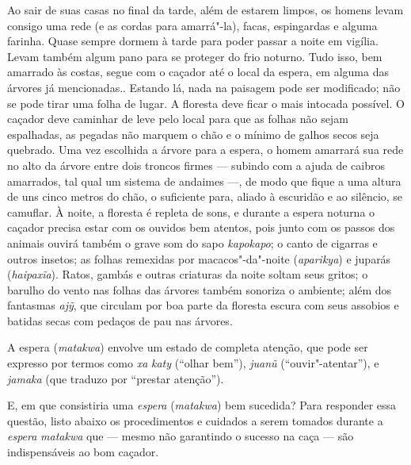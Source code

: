 Ao sair de suas casas no final da tarde, além de estarem limpos, os
homens levam consigo uma rede (e as cordas para amarrá"-la), facas,
espingardas e alguma farinha. Quase sempre dormem à tarde para poder
passar a noite em vigília. Levam também algum pano para se proteger do
frio noturno. Tudo isso, bem amarrado às costas, segue com o caçador até
o local da espera, em alguma das árvores já mencionadas.. Estando lá,
nada na paisagem pode ser modificado; não se pode tirar uma folha de
lugar. A floresta deve ficar o mais intocada possível. O caçador deve
caminhar de leve pelo local para que as folhas não sejam espalhadas, as
pegadas não marquem o chão e o mínimo de galhos secos seja quebrado. Uma
vez escolhida a árvore para a espera, o homem amarrará sua rede no alto
da árvore entre dois troncos firmes --- subindo com a ajuda de caibros
amarrados, tal qual um sistema de andaimes ---, de modo que fique a uma
altura de uns cinco metros do chão, o suficiente para, aliado à
escuridão e ao silêncio, se camuflar. À noite, a floresta é repleta de
sons, e durante a espera noturna o caçador precisa estar com os ouvidos
bem atentos, pois junto com os passos dos animais ouvirá também o grave
som do sapo \emph{kapokapo}; o canto de cigarras e outros insetos; as
folhas remexidas por macacos"-da"-noite (\emph{aparikya}) e juparás
(\emph{haipaxĩa}). Ratos, gambás e outras criaturas da noite soltam seus
gritos; o barulho do vento nas folhas das árvores também sonoriza o
ambiente; além dos fantasmas \emph{ajỹ}, que circulam por boa parte da
floresta escura com seus assobios e batidas secas com pedaços de pau nas
árvores.

A espera (\emph{matakwa}) envolve um estado de completa atenção, que
pode ser expresso por termos como \emph{xa} \emph{katy} (``olhar bem''),
\emph{juanũ} (``ouvir"-atentar''), e \emph{jamaka} (que traduzo por
``prestar atenção'').

E, em que consistiria uma \emph{espera} (\emph{matakwa}) bem sucedida?
Para responder essa questão, listo abaixo os procedimentos e cuidados a
serem tomados durante a \emph{espera} \emph{matakwa} que --- mesmo não
garantindo o sucesso na caça --- são indispensáveis ao bom caçador.

